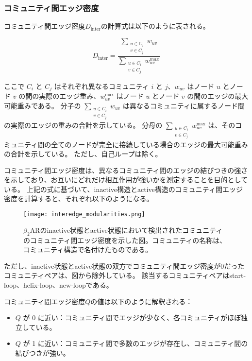 \subsubsection{コミュニティ間エッジ密度}
コミュニティ間エッジ密度$D_{\text{inter}}$の計算式は以下のように表される。

\begin{equation}
D_{\text{inter}} = \frac{\sum_{\substack{u \in C_i \\ v \in C_j}} w_{uv}}{\sum_{\substack{u \in C_i \\ v \in C_j}} w_{uv}^{max}}
\label{eq:inter_density}
\end{equation}

ここで $C_i$ と $C_j$ はそれぞれ異なるコミュニティ $i$ と $j$、$w_{uv}$ はノード $u$ とノード $v$ の間の実際のエッジ重み、$w_{uv}^{\text{max}}$ はノード $u$ とノード $v$ の間のエッジの最大可能重みである。
分子の $\sum\limits_{\substack{u \in C_i \\ v \in C_j}} w_{uv}$ は異なるコミュニティに属するノード間の実際のエッジの重みの合計を示している。
分母の $\sum\limits_{\substack{u \in C_i \\ v \in C_j}} w_{uv}^{\text{max}}$ は、そのコミュニティ間の全てのノードが完全に接続している場合のエッジの最大可能重みの合計を示している。
ただし、自己ループは除く。

コミュニティ間エッジ密度は、異なるコミュニティ間のエッジの結びつきの強さを示しており、お互いにどれだけ相互作用が強いかを測定することを目的としている。
上記の式に基づいて、inactive構造とactive構造のコミュニティ間エッジ密度を計算すると、それぞれ以下のようになる。

\begin{figure}[htbp]
    \centering
    \texttt{[image: interedge\_modularities.png]}
    \caption{$\beta_2$ARのinactive状態とactive状態において検出されたコミュニティのコミュニティ間エッジ密度を示した図。コミュニティの名称は、コミュニティ構造で名付けたものである。}
    \label{fig:inter}
\end{figure}

\newpage

ただし、inactive状態とactive状態の双方でコミュニティ間エッジ密度が0だったコミュニティペアは、図から除外している。
該当するコミュニティペアはstart-loop、helix-loop、new-loopである。

コミュニティ間エッジ密度$Q$の値は以下のように解釈される：
\begin{itemize}
    \item \( Q \) が 0 に近い：コミュニティ間でエッジが少なく、各コミュニティがほぼ独立している。
    \item \( Q \) が 1 に近い：コミュニティ間で多数のエッジが存在し、コミュニティ間の結びつきが強い。
\end{itemize}

